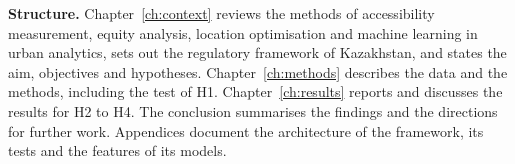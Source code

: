 \textbf{Structure.} Chapter~\ref{ch:context} reviews the methods of accessibility measurement, equity analysis, location optimisation and machine learning in urban analytics, sets out the regulatory framework of Kazakhstan, and states the aim, objectives and hypotheses. Chapter~\ref{ch:methods} describes the data and the methods, including the test of H1. Chapter~\ref{ch:results} reports and discusses the results for H2 to H4. The conclusion summarises the findings and the directions for further work. Appendices document the architecture of the framework, its tests and the features of its models.
